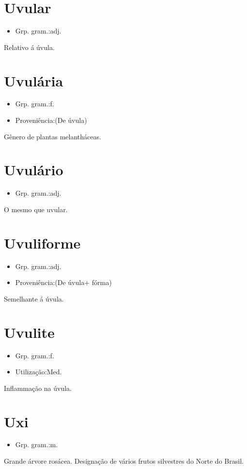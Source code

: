\documentclass{article}
\begin{document}
\section{Uvular}
\begin{itemize}
\item {Grp. gram.:adj.}
\end{itemize}
Relativo á úvula.
\section{Uvulária}
\begin{itemize}
\item {Grp. gram.:f.}
\end{itemize}
\begin{itemize}
\item {Proveniência:(De \textunderscore úvula\textunderscore )}
\end{itemize}
Gênero de plantas melantháceas.
\section{Uvulário}
\begin{itemize}
\item {Grp. gram.:adj.}
\end{itemize}
O mesmo que \textunderscore uvular\textunderscore .
\section{Uvuliforme}
\begin{itemize}
\item {Grp. gram.:adj.}
\end{itemize}
\begin{itemize}
\item {Proveniência:(De \textunderscore úvula\textunderscore  + \textunderscore fórma\textunderscore )}
\end{itemize}
Semelhante á úvula.
\section{Uvulite}
\begin{itemize}
\item {Grp. gram.:f.}
\end{itemize}
\begin{itemize}
\item {Utilização:Med.}
\end{itemize}
Inflammação na úvula.
\section{Uxi}
\begin{itemize}
\item {Grp. gram.:m.}
\end{itemize}
Grande árvore rosácea.
Designação de vários frutos silvestres do Norte do Brasil.
\end{document}
